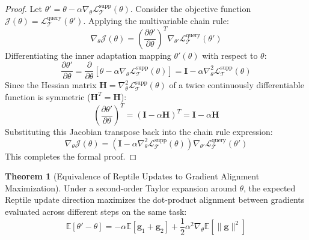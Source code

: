 \documentclass[11pt,a4paper]{article}
\theoremstyle{definition}
\newtheorem{theorem}{\textbf{Theorem}}[section]
\begin{document}
\begin{proof}
Let $\theta' = \theta - \alpha \nabla_\theta \mathcal{L}_{\mathcal{T}}^{\text{supp}}(\theta)$.
Consider the objective function $\mathcal{J}(\theta) = \mathcal{L}_{\mathcal{T}}^{\text{query}}(\theta')$.
Applying the multivariable chain rule:
{\boldmath
\begin{equation}
\nabla_\theta \mathcal{J}(\theta) = \left( \frac{\partial \theta'}{\partial \theta} \right)^T \nabla_{\theta'} \mathcal{L}_{\mathcal{T}}^{\text{query}}(\theta')
\end{equation}
}
Differentiating the inner adaptation mapping $\theta'(\theta)$ with respect to $\theta$:
{\boldmath
\begin{equation}
\frac{\partial \theta'}{\partial \theta} = \frac{\partial}{\partial \theta} \left[ \theta - \alpha \nabla_\theta \mathcal{L}_{\mathcal{T}}^{\text{supp}}(\theta) \right] = \mathbf{I} - \alpha \nabla_\theta^2 \mathcal{L}_{\mathcal{T}}^{\text{supp}}(\theta)
\end{equation}
}
Since the Hessian matrix $\mathbf{H} = \nabla_\theta^2 \mathcal{L}_{\mathcal{T}}^{\text{supp}}(\theta)$ of a twice continuously differentiable function is symmetric ($\mathbf{H}^T = \mathbf{H}$):
{\boldmath
\begin{equation}
\left( \frac{\partial \theta'}{\partial \theta} \right)^T = \left( \mathbf{I} - \alpha \mathbf{H} \right)^T = \mathbf{I} - \alpha \mathbf{H}
\end{equation}
}
Substituting this Jacobian transpose back into the chain rule expression:
{\boldmath
\begin{equation}
\nabla_\theta \mathcal{J}(\theta) = \left( \mathbf{I} - \alpha \nabla_\theta^2 \mathcal{L}_{\mathcal{T}}^{\text{supp}}(\theta) \right) \nabla_{\theta'} \mathcal{L}_{\mathcal{T}}^{\text{query}}(\theta')
\end{equation}
}
This completes the formal proof.
\end{proof}

\begin{theorem}[Equivalence of Reptile Updates to Gradient Alignment Maximization]
Under a second-order Taylor expansion around $\theta$, the expected Reptile update direction maximizes the dot-product alignment between gradients evaluated across different steps on the same task:
{\boldmath
\begin{equation}
\mathbb{E}\left[ \theta' - \theta \right] = -\alpha \mathbb{E}\left[ \mathbf{g}_1 + \mathbf{g}_2 \right] + \frac{1}{2}\alpha^2 \nabla_\theta \mathbb{E}\left[ \|\mathbf{g}\|^2 \right]
\end{equation}
}
\end{theorem}
\end{document}
